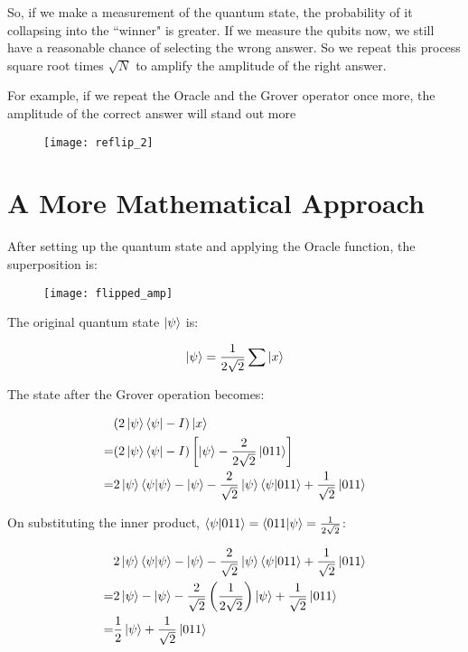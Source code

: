 \documentclass[a4paper]{article}
\begin{document}
So, if we make a measurement of the quantum state, the probability of it
collapsing into the ``winner" is greater. If we measure the qubits now, we
still have a reasonable chance of selecting the wrong answer. So we repeat this
process square root times $\sqrt{N}$ to amplify the amplitude of the right answer.

\pagebreak

For example, if we repeat the Oracle and the Grover operator once more, the
amplitude of the correct answer will stand out more

\begin{figure}[h]
\texttt{[image: reflip\_2]}
\centering
\end{figure}

\section{ A More Mathematical Approach }

After setting up the quantum state and applying the Oracle function, the 
superposition is:

\begin{figure}[h]
\texttt{[image: flipped\_amp]}
\centering
\end{figure}

\par

The original quantum state $\ket{\psi}$ is:

$$ \ket{\psi} = \frac{1}{2\sqrt{2}}\sum{\ket{x}} $$

\par

The state after the Grover operation becomes:

\begin{align*}
    & (2\ket{\psi}\bra{\psi} - I)\ket{x} \\
    = & (2\ket{\psi}\bra{\psi} - I) \left[ \ket{\psi} - \frac{2}{2\sqrt{2}}\ket{011} \right] \\
    = & 2\ket{\psi}\braket{\psi|\psi} - \ket{\psi} - \frac{2}{\sqrt{2}}\ket{\psi}\braket{\psi|011} + \frac{1}{\sqrt{2}}\ket{011}
\end{align*}

On substituting the inner product, $\braket{\psi|011} = \braket{011|\psi} = \frac{1}{2\sqrt{2}}$:

\begin{align*}
    & 2\ket{\psi}\braket{\psi|\psi} - \ket{\psi} - \frac{2}{\sqrt{2}}\ket{\psi}\braket{\psi|011} + \frac{1}{\sqrt{2}}\ket{011} \\
    = & 2\ket{\psi} - \ket{\psi} - \frac{2}{\sqrt{2}}\left(\frac{1}{2\sqrt{2}}\right)\ket{\psi} + \frac{1}{\sqrt{2}}\ket{011} \\
    = & \frac{1}{2}\ket{\psi} + \frac{1}{\sqrt{2}}\ket{011}
\end{align*}
\end{document}
